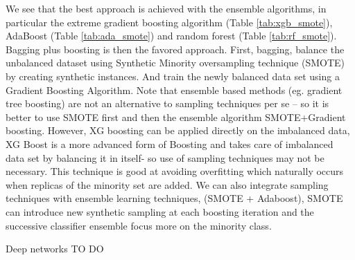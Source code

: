 \documentclass[11pt]{article}
\theoremstyle{definition}
\theoremstyle{remark}
\begin{document}
We see that the best approach is achieved with the ensemble algorithms, in particular the extreme gradient boosting algorithm (Table \ref{tab:xgb_smote}), AdaBoost (Table \ref{tab:ada_smote}) and random forest (Table \ref{tab:rf_smote}). Bagging plus boosting is then the favored approach. First, bagging, balance the unbalanced dataset using Synthetic Minority oversampling technique (SMOTE) by creating synthetic instances. And train the newly balanced data set using a Gradient Boosting Algorithm. Note that ensemble based methods (eg. gradient tree boosting) are not an alternative to sampling techniques per se – so it is better to use SMOTE first and then  the ensemble algorithm SMOTE+Gradient boosting. However, XG boosting can be applied directly on the imbalanced data, XG Boost is a more advanced form of Boosting and takes care of imbalanced data set by balancing it in itself- so use of sampling techniques may not be necessary. This technique is good at avoiding overfitting which naturally occurs when replicas of the minority set are added. 
We can also integrate sampling techniques with ensemble learning techniques,  (SMOTE + Adaboost), SMOTE can introduce new synthetic sampling at each boosting iteration and the successive classifier ensemble focus more on the minority class.

Deep networks TO DO

\end{document}

